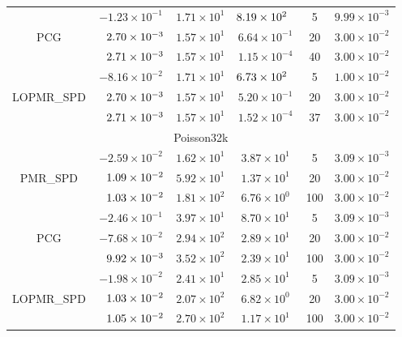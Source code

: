 \documentclass[numbers,webpdf,imanum]{ima-authoring-template}%
\theoremstyle{thmstyletwo}%
\numberwithin{equation}{section}
\begin{document}
\begin{table}
\begin{tabular}{cccccc}
\cmidrule{2-6}
\multirow{3}{*}{PCG} 
& $-1.23\times 10^{-1}$ & $1.71\times 10^{1}$ & $8.19\times 10^{2\hphantom{-}}$ & 5 & $9.99\times 10^{-3}$\\
& $\hphantom{-}2.70\times 10^{-3}$ & $1.57\times 10^{1}$ & $6.64\times 10^{-1}$ & 20 & $3.00\times 10^{-2}$\\
& $\hphantom{-}2.71\times 10^{-3}$ & $1.57\times 10^{1}$ & $1.15\times 10^{-4}$ & 40 & $3.00\times 10^{-2}$\\
\cmidrule{2-6}
\multirow{3}{*}{LOPMR\_SPD} 
& $-8.16\times 10^{-2}$ & $1.71\times 10^{1}$ & $6.73\times 10^{2\hphantom{-}}$ & 5 & $1.00\times 10^{-2}$\\
& $\hphantom{-}2.70\times 10^{-3}$ & $1.57\times 10^{1}$ & $5.20\times 10^{-1}$ & 20 & $3.00\times 10^{-2}$\\
& $\hphantom{-}2.71\times 10^{-3}$ & $1.57\times 10^{1}$ & $1.52\times 10^{-4}$ & 37 & $3.00\times 10^{-2}$\\
\midrule
\multicolumn{6}{c}{Poisson32k}\\
\multirow{3}{*}{PMR\_SPD} 
& $-2.59\times 10^{-2}$ & $1.62\times 10^{1}$ & $3.87\times 10^{1}$ & 5 & $3.09\times 10^{-3}$\\
& $\hphantom{-}1.09\times 10^{-2}$ & $5.92\times 10^{1}$ & $1.37\times 10^{1}$ & 20 & $3.00\times 10^{-2}$\\
& $\hphantom{-}1.03\times 10^{-2}$ & $1.81\times 10^{2}$ & $6.76\times 10^{0}$ & 100 & $3.00\times 10^{-2}$\\
\cmidrule{2-6}
\multirow{3}{*}{PCG} 
& $-2.46\times 10^{-1}$ & $3.97\times 10^{1}$ & $8.70\times 10^{1}$ & 5 & $3.09\times 10^{-3}$\\
& $-7.68\times 10^{-2}$ & $2.94\times 10^{2}$ & $2.89\times 10^{1}$ & 20 & $3.00\times 10^{-2}$\\
& $\hphantom{-}9.92\times 10^{-3}$ & $3.52\times 10^{2}$ & $2.39\times 10^{1}$ & 100 & $3.00\times 10^{-2}$\\
\cmidrule{2-6}
\multirow{3}{*}{LOPMR\_SPD} 
& $-1.98\times 10^{-2}$ & $2.41\times 10^{1}$ & $2.85\times 10^{1}$ & 5 & $3.09\times 10^{-3}$\\
& $\hphantom{-}1.03\times 10^{-2}$ & $2.07\times 10^{2}$ & $6.82\times 10^{0}$ & 20 & $3.00\times 10^{-2}$\\
& $\hphantom{-}1.05\times 10^{-2}$ & $2.70\times 10^{2}$ & $1.17\times 10^{1}$ & 100 & $3.00\times 10^{-2}$\\
\bottomrule
\end{tabular}
\end{table}
\end{document}
